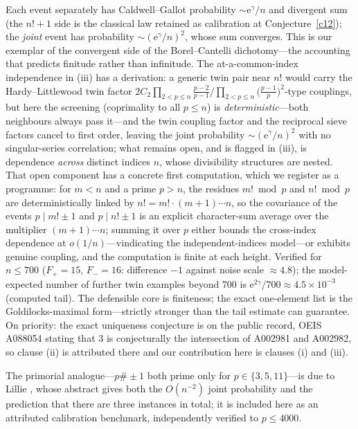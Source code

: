 \documentclass[11pt]{article}
\theoremstyle{definition}
\newcommand{\e}{\mathrm{e}}
\begin{document}
Each event separately has Caldwell--Gallot probability
$\sim\e^{\gamma}/n$ \cite{CaldwellGallot} and divergent sum (the
$n!+1$ side is the classical law retained as calibration at
Conjecture~\ref{c12}); the \emph{joint} event
has probability $\sim(\e^{\gamma}/n)^2$, whose sum converges.  This is
our exemplar of the convergent side of the Borel--Cantelli
dichotomy---the accounting that predicts finitude rather than
infinitude.  The at-a-common-index independence in (iii) has a derivation: a
generic twin pair near $n!$ would carry
the Hardy--Littlewood twin
factor $2C_2\prod_{2<p\le n}\frac{p-2}{p-1}\big/
\prod_{2<p\le n}\bigl(\tfrac{p-1}p\bigr)^{\!2}$-type couplings, but
here the screening (coprimality to all $p\le n$) is
\emph{deterministic}---both neighbours always pass it---and the twin
coupling factor and the reciprocal sieve factors cancel to first
order, leaving the joint probability $\sim(\e^{\gamma}/n)^2$ with no
singular-series correlation; what remains open, and is flagged in
(iii), is dependence \emph{across} distinct indices $n$, whose
divisibility structures are nested.  That open component has a
concrete first computation, which we register as a
programme: for $m<n$ and a prime $p>n$, the residues $m!\bmod p$ and
$n!\bmod p$ are deterministically linked by
$n!=m!\cdot(m{+}1)\cdots n$, so the covariance of the events
$p\mid m!\pm1$ and $p\mid n!\pm1$ is an explicit character-sum
average over the multiplier $(m{+}1)\cdots n$; summing it over $p$
either bounds the cross-index dependence at $o(1/n)$---vindicating
the independent-indices model---or exhibits genuine coupling, and
the computation is finite at each height.
Verified for $n\le700$ ($F_+=15$, $F_-=16$: difference $-1$ against
noise scale $\approx4.8$); the model-expected number of further twin
examples beyond $700$ is $\e^{2\gamma}/700\approx4.5\times10^{-3}$
(computed tail).  The defensible core is finiteness; the exact
one-element list is the Goldilocks-maximal form---strictly stronger
than the tail estimate can guarantee.  On priority: the exact
uniqueness conjecture is on the public record, OEIS A088054 stating
that $3$ is conjecturally the intersection of A002981 and A002982, so
clause (ii) is attributed there and our contribution here is clauses (i) and
(iii).

The primorial analogue---$p\#\pm1$ both prime only for
$p\in\{3,5,11\}$---is due to Lillie \cite{Lillie}, whose abstract
gives both the $O(n^{-2})$ joint probability and the prediction that
there are three instances in total; it is included here as an
attributed calibration benchmark, independently verified to
$p\le4000$.
\end{document}
